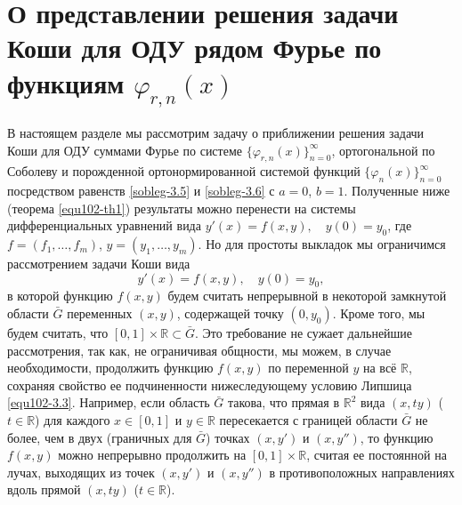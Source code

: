 \section{О представлении решения задачи Коши для ОДУ рядом Фурье по функциям $\varphi_{r,n}(x)$}
В настоящем разделе мы рассмотрим задачу о приближении решения задачи Коши для ОДУ  суммами  Фурье по системе $\{\varphi_{r,n}(x)\}_{n=0}^\infty$, ортогональной по Соболеву и порожденной ортонормированной системой функций $\{\varphi_{n}(x)\}_{n=0}^\infty$ посредством равенств \eqref{sobleg-3.5} и \eqref{sobleg-3.6} с $a=0$, $b=1$.
 Полученные ниже (теорема \ref{equ102-th1}) результаты можно перенести на системы дифференциальных уравнений вида
$y'(x)=f(x,y), \quad y(0)=y_0$, где $f=(f_1, \ldots, f_m)$, $y=(y_1, \ldots, y_m)$. Но для простоты выкладок мы ограничимся рассмотрением задачи Коши вида
\begin{equation}\label{equ102-3.1}
y'(x)=f(x,y), \quad y(0)=y_0,
\end{equation}
 в которой функцию   $f(x,y)$  будем считать непрерывной в некоторой замкнутой  области $\bar G$ переменных $(x,y)$, содержащей точку $(0,y_0)$. Кроме того, мы будем  считать, что  $[0,1]\times\mathbb{R}\subset\bar G$. Это требование не сужает дальнейшие рассмотрения, так как, не ограничивая общности,  мы можем, в случае необходимости, продолжить функцию $f(x,y)$ по переменной $y$ на всё $\mathbb{R}$, сохраняя свойство ее подчиненности  нижеследующему условию Липшица \eqref{equ102-3.3}. Например, если область $\bar G$ такова, что  прямая в $\mathbb{R}^{2}$ вида $(x,ty)$ ($t\in\mathbb{R}$) для каждого $x\in[0,1]$ и $y\in\mathbb{R}$ пересекается с границей области $\bar G$ не более, чем в двух (граничных для $\bar G$) точках $(x,y')$ и $(x,y'')$, то функцию $f(x,y)$ можно непрерывно продолжить   на $[0,1]\times\mathbb{R}$, считая ее  постоянной на лучах, выходящих из точек  $(x,y')$ и $(x,y'')$ в противоположных направлениях вдоль прямой $(x,ty)$ ($t\in\mathbb{R}$).

